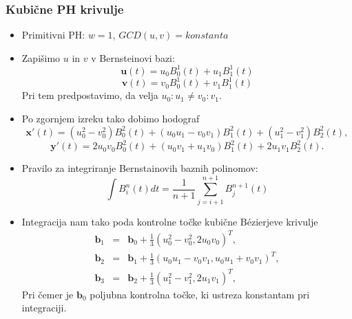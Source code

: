 \documentclass[12pt]{beamer}
\theoremstyle{definition} %
\theoremstyle{plain} %
\begin{document}
\begin{frame}
\frametitle{Kubične PH krivulje}
    \begin{itemize}
        \item Primitivni PH: $w=1$, $GCD(u, v) = konstanta$ %
        \item Zapišimo $u$ in $v$ v Bernsteinovi bazi:
              $$ \textbf{u}(t) = u_0 B_0^1(t) + u_1 B_1^1(t) $$
              $$ \textbf{v}(t) = v_0 B_0^1(t) + v_1 B_1^1(t) $$
              Pri tem predpostavimo, da velja $u_0 : u_1 \neq v_0 : v_1$.
        \item Po zgornjem izreku tako dobimo hodograf
              $$\textbf{x}'(t) = (u_0^2 - v_0^2)B_0^2(t) + (u_0 u_1 - v_0 v_1) B_1^2(t) + (u_1^2 - v_1^2) B_2^2(t),$$
              $$\textbf{y}'(t) = 2 u_0 v_0 B_0^2(t) + (u_0 v_1 + u_1 v_0) B_1^2(t) + 2 u_1 v_1 B_2^2(t).$$
    \end{itemize}
\end{frame}
\begin{frame}
    \begin{itemize}
        \item Pravilo za integriranje Bernstainovih baznih polinomov:
              $$\int B^n_i(t) dt = \frac{1}{n+1} \sum_{j=i+1}^{n+1} B^{n+1}_j(t)$$
        \item Integracija nam tako poda kontrolne točke kubične B\'ezierjeve krivulje
              \begin{eqnarray}
                  \textbf{b}_1 &=& \textbf{b}_0 + \frac{1}{3}(u_0^2 - v_0^2, 2 u_0 v_0)^T,\nonumber\\
                  \textbf{b}_2 &=& \textbf{b}_1 + \frac{1}{3}(u_0 u_1 - v_0 v_1, u_0 u_1 + v_0 v_1)^T,\nonumber\\
                  \textbf{b}_3 &=& \textbf{b}_2 + \frac{1}{3} (u_1^2 - v_1^2, 2 u_1 v_1)^T,\nonumber
              \end{eqnarray}
            Pri čemer je $\textbf{b}_0$ poljubna kontrolna točke, ki ustreza konstantam pri integraciji.
    \end{itemize}
\end{frame}

\end{document}

